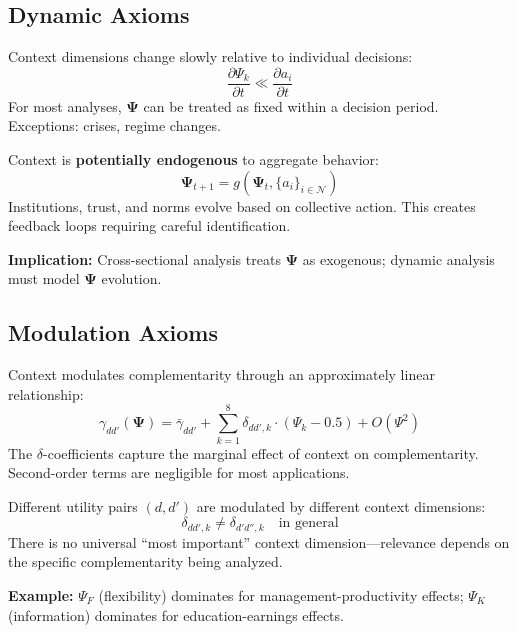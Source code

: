 \subsection{Dynamic Axioms}

\begin{axiom}
\label{ax:psi-stable}
Context dimensions change slowly relative to individual decisions:
\[
\frac{\partial \Psi_k}{\partial t} \ll \frac{\partial a_i}{\partial t}
\]
For most analyses, $\boldsymbol{\Psi}$ can be treated as fixed within a 
decision period. Exceptions: crises, regime changes.
\end{axiom}

\begin{axiom}
\label{ax:psi-endo}
Context is \textbf{potentially endogenous} to aggregate behavior:
\[
\boldsymbol{\Psi}_{t+1} = g(\boldsymbol{\Psi}_t, \{a_i\}_{i \in \mathcal{N}})
\]
Institutions, trust, and norms evolve based on collective action. 
This creates feedback loops requiring careful identification.

\textbf{Implication:} Cross-sectional analysis treats $\boldsymbol{\Psi}$ 
as exogenous; dynamic analysis must model $\boldsymbol{\Psi}$ evolution.
\end{axiom}

\subsection{Modulation Axioms}

\begin{axiom}
\label{ax:psi-mod}
Context modulates complementarity through an approximately linear relationship:
\[
\gamma_{dd'}(\boldsymbol{\Psi}) = \bar{\gamma}_{dd'} + \sum_{k=1}^{8} 
\delta_{dd',k} \cdot (\Psi_k - 0.5) + O(\Psi^2)
\]
The $\delta$-coefficients capture the marginal effect of context on 
complementarity. Second-order terms are negligible for most applications.
\end{axiom}

\begin{axiom}
\label{ax:psi-hetero}
Different utility pairs $(d, d')$ are modulated by different context dimensions:
\[
\delta_{dd',k} \neq \delta_{d'd'',k} \quad \text{in general}
\]
There is no universal ``most important'' context dimension---relevance 
depends on the specific complementarity being analyzed.

\textbf{Example:} $\Psi_F$ (flexibility) dominates for management-productivity 
effects; $\Psi_K$ (information) dominates for education-earnings effects.
\end{axiom}


